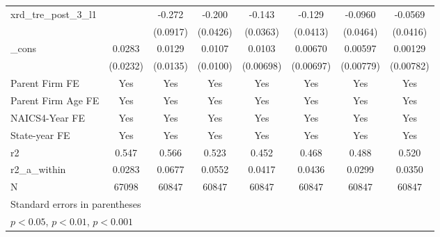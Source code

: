{\begin{tabular}{l*{7}{c}}
xrd\_tre\_post\_3\_l1&                     &      -0.272\sym{**} &      -0.200\sym{***}&      -0.143\sym{***}&      -0.129\sym{**} &     -0.0960\sym{*}  &     -0.0569         \\
            &                     &    (0.0917)         &    (0.0426)         &    (0.0363)         &    (0.0413)         &    (0.0464)         &    (0.0416)         \\
[1em]
\_cons      &      0.0283         &      0.0129         &      0.0107         &      0.0103         &     0.00670         &     0.00597         &     0.00129         \\
            &    (0.0232)         &    (0.0135)         &    (0.0100)         &   (0.00698)         &   (0.00697)         &   (0.00779)         &   (0.00782)         \\
[1em]
Parent Firm FE&         Yes         &         Yes         &         Yes         &         Yes         &         Yes         &         Yes         &         Yes         \\
[1em]
Parent Firm Age FE&         Yes         &         Yes         &         Yes         &         Yes         &         Yes         &         Yes         &         Yes         \\
[1em]
NAICS4-Year FE&         Yes         &         Yes         &         Yes         &         Yes         &         Yes         &         Yes         &         Yes         \\
[1em]
State-year FE&         Yes         &         Yes         &         Yes         &         Yes         &         Yes         &         Yes         &         Yes         \\
\hline
r2          &       0.547         &       0.566         &       0.523         &       0.452         &       0.468         &       0.488         &       0.520         \\
r2\_a\_within &      0.0283         &      0.0677         &      0.0552         &      0.0417         &      0.0436         &      0.0299         &      0.0350         \\
N           &       67098         &       60847         &       60847         &       60847         &       60847         &       60847         &       60847         \\
\hline\hline
\multicolumn{8}{l}{\footnotesize Standard errors in parentheses}\\
\multicolumn{8}{l}{\footnotesize \sym{*} \(p<0.05\), \sym{**} \(p<0.01\), \sym{***} \(p<0.001\)}\\
\end{tabular}
}

